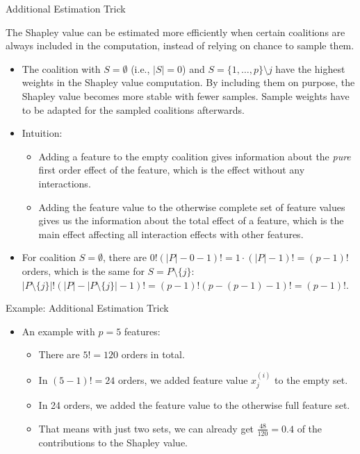\documentclass[aspectratio=169]{../latex_main/tntbeamer}  %
\begin{document}
\begin{frame}{Additional Estimation Trick}

  \vspace{-1em}
  The Shapley value can be estimated more efficiently when certain coalitions are always included in the computation, instead of relying on chance to sample them.
  \begin{itemize}
    \item The coalition with $S = \emptyset$ (i.e., $|S| = 0$) and $S = \{1, \ldots, p\} \setminus j$ have the highest weights in the Shapley value computation. By including them on purpose, the Shapley value becomes more stable with fewer samples. Sample weights have to be adapted for the sampled coalitions afterwards.
    \item Intuition: 
    \begin{itemize}
        \item Adding a feature to the empty coalition gives information about the \textit{pure} first order effect of the feature, which is the effect without any interactions.
        \item Adding the feature value to the otherwise complete set of feature values gives us the information about the total effect of a feature, which is the main effect affecting all interaction effects with other features.
    \end{itemize} 
    \item For coalition $S = \emptyset$, there are $0! (|P| - 0 - 1)! = 1 \cdot (|P| - 1)! = (p - 1)!$ orders, which is the same for $S = P \setminus \{j\}$: $|P \setminus \{j\}|! (|P| - |P \setminus \{j\}| - 1)! = (p - 1)! (p - (p-1) - 1)! = (p-1)!$.
    \end{itemize}
\end{frame}

\begin{frame}{Example: Additional Estimation Trick} 
    \begin{itemize}
    \item An example with $p = 5$ features:
      \begin{itemize}
        \item There are $5! = 120$ orders in total.
        \item In $(5 - 1)! = 24$ orders, we added feature value $x_j^{(i)}$ to the empty set.
        \item In 24 orders, we added the feature value to the otherwise full feature set.
        \item That means with just two sets, we can already get $\frac{48}{120} = 0.4$ of the contributions to the Shapley value.
      \end{itemize}
     \end{itemize}
\end{frame}
\end{document}
